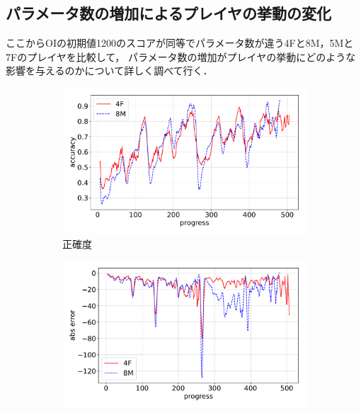 \subsection{パラメータ数の増加によるプレイヤの挙動の変化}
ここからOIの初期値1200のスコアが同等でパラメータ数が違う4Fと8M，5Mと7Fのプレイヤを比較して，
パラメータ数の増加がプレイヤの挙動にどのような影響を与えるのかについて詳しく調べて行く．
\begin{figure}[t]
\centering
\begin{subfigure}[b]{0.8\linewidth}
    \includegraphics[width=\linewidth]{pdf/compare/NT4F_and_NT8M/accuracy.pdf}
    \caption{正確度}
    \label{fig:NT4F_and_NT8M_accuracy}
\end{subfigure}
\begin{subfigure}[b]{0.8\linewidth}
    \includegraphics[width=\linewidth]{pdf/compare/NT4F_and_NT8M/error_abs.pdf}

\end{subfigure}
\end{figure}
